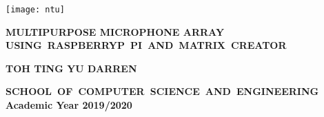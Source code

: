  \begin{titlepage}
    \begin{center}
        \texttt{[image: ntu]}
    \end{center}
    \begin{flushleft}
        \Large
        \textbf{MULTIPURPOSE MICROPHONE ARRAY}
	\large
	\mbox{\textbf{USING RASPBERRYP PI AND MATRIX CREATOR}}
    \end{flushleft}
        \vspace{2.0cm}
    
     \begin{center}
        \large
        \textbf{TOH TING YU DARREN}
        
       
        \vspace{1.0cm}
        
        
        
        \vspace{0.5cm}
        \large
        \mbox{\textbf{SCHOOL OF COMPUTER SCIENCE AND ENGINEERING}}
	\vspace{0.3cm}
	\textbf{Academic Year 2019/2020}
    \end{center}
\end{titlepage}